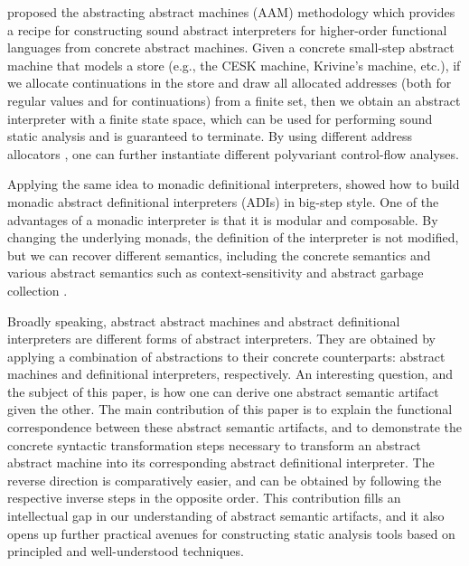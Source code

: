 \documentclass[acmsmall, screen]{acmart}\settopmatter{}
\begin{document}
 proposed the abstracting abstract machines (AAM)
methodology which provides a recipe for constructing sound abstract interpreters
for higher-order functional languages from concrete abstract machines.
Given a concrete small-step abstract machine that models a store
(e.g., the CESK machine, Krivine's machine, etc.), if we allocate continuations
in the store and draw all allocated addresses (both for regular values and
for continuations) from a finite set, then
we obtain an abstract interpreter with a finite state space, which can be used for
performing sound static analysis and is guaranteed to terminate.
By using different address allocators \cite{Gilray:2016:ACP:2951913.2951936},
one can further instantiate different polyvariant control-flow analyses.

Applying the same idea to monadic definitional interpreters, \citet{darais2017abstracting}
showed how to build monadic abstract definitional interpreters (ADIs) in big-step style.
One of the advantages of a monadic interpreter is
that it is modular and composable. By changing the underlying monads, the definition
of the interpreter is not modified, but we can recover different semantics, including
the concrete semantics and various abstract semantics such as context-sensitivity and
abstract garbage collection \cite{Sergey:2013:MAI:2491956.2491979}.

Broadly speaking, abstract abstract machines and abstract definitional interpreters are
different forms of abstract interpreters. They are obtained by applying a combination
of abstractions to their concrete counterparts: abstract machines and definitional
interpreters, respectively. An interesting question, and the subject of this paper, is
how one can derive one abstract semantic artifact given the other.
The main contribution of this paper is to explain the functional correspondence
between these abstract semantic artifacts, and to demonstrate the concrete
syntactic transformation steps necessary to transform an abstract abstract machine
into its corresponding abstract definitional interpreter. The reverse direction
is comparatively easier, and can be obtained by following the respective inverse
steps in the opposite order. This contribution fills an intellectual gap in our
understanding of abstract semantic artifacts, and it also opens up further practical
avenues for constructing static analysis tools based on principled and well-understood
techniques.
\end{document}
